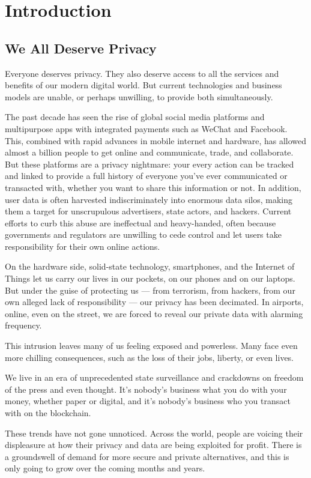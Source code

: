 \documentclass[8pt,fleqn,openany]{book}
\begin{document}
\chapter{Introduction}\label{chap:intro}

\section{We All Deserve Privacy}
Everyone deserves privacy. They also deserve access to all the services and benefits of our modern digital world. But current technologies and business models are unable, or perhaps unwilling, to provide both simultaneously.

The past decade has seen the rise of global social media platforms and multipurpose apps with integrated payments such as WeChat and Facebook. This, combined with rapid advances in mobile internet and hardware, has allowed almost a billion people to get online and communicate, trade, and collaborate. But these platforms are a privacy nightmare: your every action can be tracked and linked to provide a full history of everyone you've ever communicated or transacted with, whether you want to share this information or not. In addition, user data is often harvested indiscriminately into enormous data silos, making them a target for unscrupulous advertisers, state actors, and hackers. Current efforts to curb this abuse are ineffectual and heavy-handed, often because governments and regulators are unwilling to cede control and let users take responsibility for their own online actions.

On the hardware side, solid-state technology, smartphones, and the Internet of Things let us carry our lives in our pockets, on our phones and on our laptops. But under the guise of protecting us — from terrorism, from hackers, from our own alleged lack of responsibility — our privacy has been decimated. In airports, online, even on the street, we are forced to reveal our private data with alarming frequency.

This intrusion leaves many of us feeling exposed and powerless. Many face even more chilling consequences, such as the loss of their jobs, liberty, or even lives. 

We live in an era of unprecedented state surveillance and crackdowns on freedom of the press and even thought. It’s nobody’s business what you do with your money, whether paper or digital, and it’s nobody's business who you transact with on the blockchain.

These trends have not gone unnoticed. Across the world, people are voicing their displeasure at how their privacy and data are being exploited for profit. There is a groundswell of demand for more secure and private alternatives, and this is only going to grow over the coming months and years.
\end{document}
